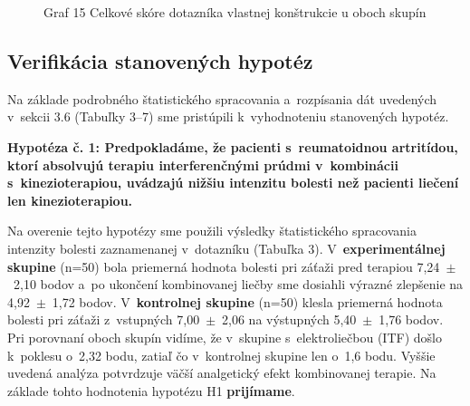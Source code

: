 \begin{figure}[H]
    \centering
    \caption*{Graf 15 Celkové skóre dotazníka vlastnej konštrukcie u oboch skupín}
    \label{fig:vlastny_dotaznik}
\end{figure}

\clearpage

\subsection{Verifikácia stanovených hypotéz}

Na základe podrobného štatistického spracovania a~rozpísania dát uvedených v~sekcii 3.6 (Tabuľky 3--7) sme pristúpili k~vyhodnoteniu stanovených hypotéz.

\textbf{Hypotéza č. 1: Predpokladáme, že pacienti s~reumatoidnou artritídou, ktorí absolvujú terapiu interferenčnými prúdmi v~kombinácii s~kinezioterapiou, uvádzajú nižšiu intenzitu bolesti než pacienti liečení len kinezioterapiou.}

Na overenie tejto hypotézy sme použili výsledky štatistického spracovania intenzity bolesti zaznamenanej v~dotazníku (Tabuľka 3). V~\textbf{experimentálnej skupine} (n=50) bola priemerná hodnota bolesti pri záťaži pred terapiou 7,24~$\pm$~2,10 bodov a~po ukončení kombinovanej liečby sme dosiahli výrazné zlepšenie na 4,92~$\pm$~1,72 bodov. V~\textbf{kontrolnej skupine} (n=50) klesla priemerná hodnota bolesti pri záťaži z~vstupných 7,00~$\pm$~2,06 na výstupných 5,40~$\pm$~1,76 bodov. Pri porovnaní oboch skupín vidíme, že v~skupine s~elektroliečbou (ITF) došlo k~poklesu o~2,32 bodu, zatiaľ čo v~kontrolnej skupine len o~1,6 bodu. Vyššie uvedená analýza potvrdzuje väčší analgetický efekt kombinovanej terapie. Na základe tohto hodnotenia hypotézu H1 \textbf{prijímame}.

